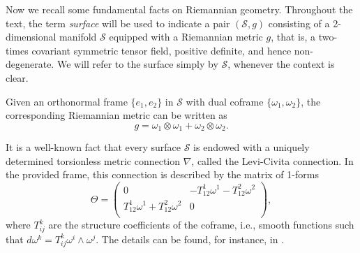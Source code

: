 \documentclass{article}
\theoremstyle{remark}
\theoremstyle{definition}
\begin{document}


Now we recall some fundamental facts on Riemannian geometry. Throughout the text, the term \emph{surface} will be used to indicate a pair $(\mathcal{S},g)$ consisting of a 2-dimensional manifold $\mathcal{S}$ equipped with a Riemannian metric $g$, that is, a two-times covariant symmetric tensor field, positive definite, and hence non-degenerate. We will refer to the surface simply by $\mathcal{S}$, whenever the context is clear.

Given an orthonormal frame $\{e_1,e_2\}$ in $\mathcal{S}$ with dual coframe $\{\omega_1,\omega_2\}$, the corresponding Riemannian metric can be written as \cite{lee2006curvature}
\begin{equation}\label{metrictensor}
    g=\omega_1 \otimes \omega_1+\omega_2 \otimes \omega_2.
\end{equation}

It is a well-known fact that every surface $\mathcal{S}$ is endowed with a
uniquely determined torsionless metric connection $\nabla$, called the Levi-Civita connection. In the provided frame, this connection is described by the matrix of 1-forms
\begin{equation}\label{connectionform}
\Theta=\begin{pmatrix}
0&-T_{12}^1 \omega^1-T_{12}^2\omega^2\\ 
T_{12}^1 \omega^1+T_{12}^2 \omega^2&0\\
\end{pmatrix},
\end{equation}
where $T_{ij}^k$ are the structure coefficients of the coframe, i.e., smooth functions such that $d\omega^k=T_{ij}^k \omega^i \wedge \omega^j$. The details can be found, for instance, in \cite{chen1999lectures,Morita,ivey2016cartan}.
\end{document}
